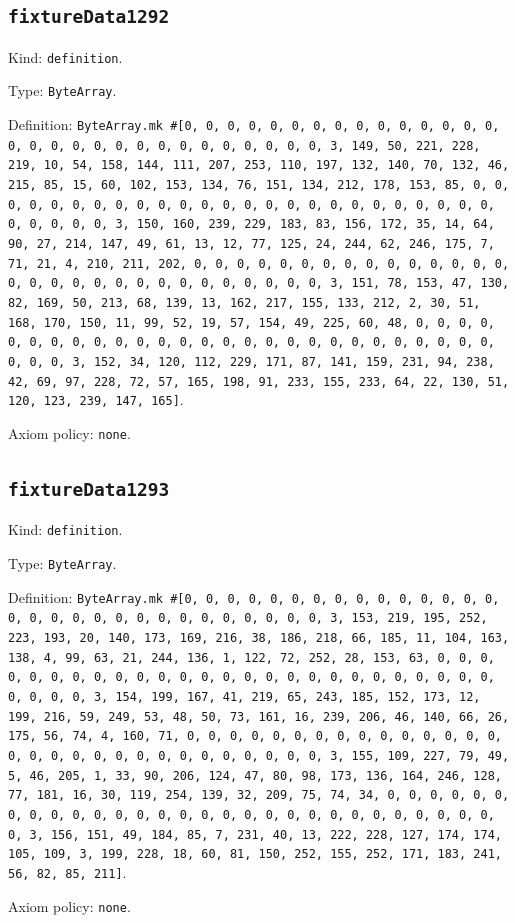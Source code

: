 \documentclass[11pt]{article}
\begin{document}
\subsection*{\texttt{fixtureData1292}}
\noindent Kind: \texttt{definition}.\par
\noindent Type: \texttt{ByteArray}.\par
\noindent Definition: \texttt{ByteArray.mk \#[0, 0, 0, 0, 0, 0, 0, 0, 0, 0, 0, 0, 0, 0, 0, 0, 0, 0, 0, 0, 0, 0, 0, 0, 0, 0, 0, 0, 0, 0, 3, 149, 50, 221, 228, 219, 10, 54, 158, 144, 111, 207, 253, 110, 197, 132, 140, 70, 132, 46, 215, 85, 15, 60, 102, 153, 134, 76, 151, 134, 212, 178, 153, 85, 0, 0, 0, 0, 0, 0, 0, 0, 0, 0, 0, 0, 0, 0, 0, 0, 0, 0, 0, 0, 0, 0, 0, 0, 0, 0, 0, 0, 0, 0, 3, 150, 160, 239, 229, 183, 83, 156, 172, 35, 14, 64, 90, 27, 214, 147, 49, 61, 13, 12, 77, 125, 24, 244, 62, 246, 175, 7, 71, 21, 4, 210, 211, 202, 0, 0, 0, 0, 0, 0, 0, 0, 0, 0, 0, 0, 0, 0, 0, 0, 0, 0, 0, 0, 0, 0, 0, 0, 0, 0, 0, 0, 0, 0, 3, 151, 78, 153, 47, 130, 82, 169, 50, 213, 68, 139, 13, 162, 217, 155, 133, 212, 2, 30, 51, 168, 170, 150, 11, 99, 52, 19, 57, 154, 49, 225, 60, 48, 0, 0, 0, 0, 0, 0, 0, 0, 0, 0, 0, 0, 0, 0, 0, 0, 0, 0, 0, 0, 0, 0, 0, 0, 0, 0, 0, 0, 0, 0, 3, 152, 34, 120, 112, 229, 171, 87, 141, 159, 231, 94, 238, 42, 69, 97, 228, 72, 57, 165, 198, 91, 233, 155, 233, 64, 22, 130, 51, 120, 123, 239, 147, 165]}.\par
\noindent Axiom policy: \texttt{none}.\par
\subsection*{\texttt{fixtureData1293}}
\noindent Kind: \texttt{definition}.\par
\noindent Type: \texttt{ByteArray}.\par
\noindent Definition: \texttt{ByteArray.mk \#[0, 0, 0, 0, 0, 0, 0, 0, 0, 0, 0, 0, 0, 0, 0, 0, 0, 0, 0, 0, 0, 0, 0, 0, 0, 0, 0, 0, 0, 0, 3, 153, 219, 195, 252, 223, 193, 20, 140, 173, 169, 216, 38, 186, 218, 66, 185, 11, 104, 163, 138, 4, 99, 63, 21, 244, 136, 1, 122, 72, 252, 28, 153, 63, 0, 0, 0, 0, 0, 0, 0, 0, 0, 0, 0, 0, 0, 0, 0, 0, 0, 0, 0, 0, 0, 0, 0, 0, 0, 0, 0, 0, 0, 0, 3, 154, 199, 167, 41, 219, 65, 243, 185, 152, 173, 12, 199, 216, 59, 249, 53, 48, 50, 73, 161, 16, 239, 206, 46, 140, 66, 26, 175, 56, 74, 4, 160, 71, 0, 0, 0, 0, 0, 0, 0, 0, 0, 0, 0, 0, 0, 0, 0, 0, 0, 0, 0, 0, 0, 0, 0, 0, 0, 0, 0, 0, 0, 0, 3, 155, 109, 227, 79, 49, 5, 46, 205, 1, 33, 90, 206, 124, 47, 80, 98, 173, 136, 164, 246, 128, 77, 181, 16, 30, 119, 254, 139, 32, 209, 75, 74, 34, 0, 0, 0, 0, 0, 0, 0, 0, 0, 0, 0, 0, 0, 0, 0, 0, 0, 0, 0, 0, 0, 0, 0, 0, 0, 0, 0, 0, 0, 0, 3, 156, 151, 49, 184, 85, 7, 231, 40, 13, 222, 228, 127, 174, 174, 105, 109, 3, 199, 228, 18, 60, 81, 150, 252, 155, 252, 171, 183, 241, 56, 82, 85, 211]}.\par
\noindent Axiom policy: \texttt{none}.\par
\end{document}
